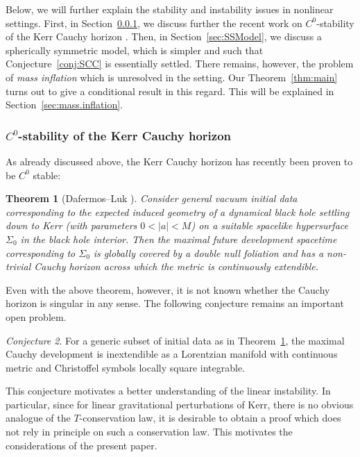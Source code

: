 \documentclass[10pt, reqno]{amsart}
\newtheorem{theorem}{Theorem}[section]
\theoremstyle{definition}
\theoremstyle{remark}
\newtheorem{conjecture}[theorem]{Conjecture}
\numberwithin{equation}{section}
\newcommand{\0}{\emptyset}
\begin{document}
Below, we will further explain the stability and instability issues in nonlinear settings. First, in Section~\ref{sec:C0.Kerr}, we discuss further the recent work on $C^0$-stability of the Kerr Cauchy horizon \cite{DL}. Then, in Section~\ref{sec:SSModel}, we discuss a spherically symmetric model, which is simpler and such that Conjecture~\ref{conj:SCC} is essentially settled. There remains, however, the problem of \emph{mass inflation} which is unresolved in the setting. Our Theorem~\ref{thm:main} turns out to give a conditional result in this regard. This will be explained in Section~\ref{sec:mass.inflation}.


\subsubsection{$C^0$-stability of the Kerr Cauchy horizon}\label{sec:C0.Kerr}
As already discussed above, the Kerr Cauchy horizon has recently been proven to be $C^0$ stable:

\begin{theorem}[Dafermos--Luk \cite{DL}]\label{thm:DL}
Consider general vacuum initial data corresponding to the expected induced geometry of a
dynamical black hole settling down to Kerr (with parameters $0 < |a| < M$) on a suitable spacelike hypersurface
$\Sigma_0$ in the black hole interior. Then the maximal future development spacetime corresponding to $\Sigma_0$
is globally covered by a double null foliation and has a non-trivial Cauchy horizon across which the
metric is continuously extendible.
\end{theorem}

Even with the above theorem, however, it is not known whether the Cauchy horizon is singular in any sense. The following conjecture remains an important open problem.

\begin{conjecture}\label{conj:instab}
For a generic subset of initial data as in Theorem~\ref{thm:DL}, the maximal Cauchy development is inextendible as a Lorentzian manifold with
continuous metric and Christoffel symbols locally square integrable.
\end{conjecture}

This conjecture motivates a better understanding of the linear instability. In particular, since for linear gravitational perturbations of Kerr, there is no obvious analogue of the $T$-conservation law, it is desirable to obtain a proof which does not rely in principle on such a conservation law. This motivates the considerations of the present paper.
\end{document}
